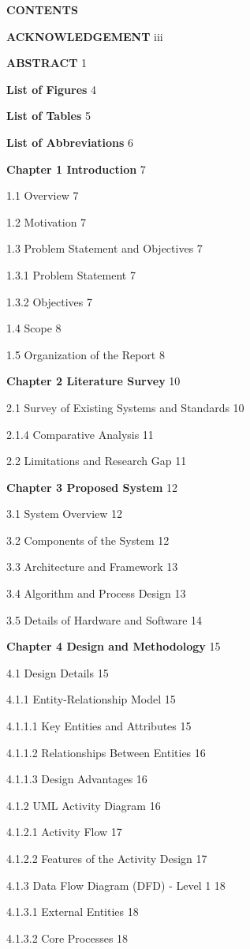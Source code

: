 \documentclass[12pt,a4paper,oneside]{report}
\begin{document}
\begin{center}\textbf{CONTENTS}\end{center}
\textbf{ACKNOWLEDGEMENT}	iii

\textbf{ABSTRACT}	1

\textbf{List of Figures}	4

\textbf{List of Tables}	5

\textbf{List of Abbreviations}	6

\textbf{Chapter 1  Introduction}	7

1.1 Overview	7

1.2 Motivation	7

1.3 Problem Statement and Objectives	7

1.3.1 Problem Statement	7

1.3.2 Objectives	7

1.4 Scope	8

1.5 Organization of the Report	8

\textbf{Chapter 2  Literature Survey}	10

2.1 Survey of Existing Systems and Standards	10

2.1.4 Comparative Analysis	11

2.2 Limitations and Research Gap	11

\textbf{Chapter 3  Proposed System}	12

3.1 System Overview	12

3.2 Components of the System	12

3.3 Architecture and Framework	13

3.4 Algorithm and Process Design	13

3.5 Details of Hardware and Software	14

\textbf{Chapter 4  Design and Methodology}	15

4.1 Design Details	15

4.1.1 Entity-Relationship Model	15

4.1.1.1 Key Entities and Attributes	15

4.1.1.2 Relationships Between Entities	16

4.1.1.3 Design Advantages	16

4.1.2 UML Activity Diagram	16

4.1.2.1 Activity Flow	17

4.1.2.2 Features of the Activity Design	17

4.1.3 Data Flow Diagram (DFD) - Level 1	18

4.1.3.1 External Entities	18

4.1.3.2 Core Processes	18
\end{document}
